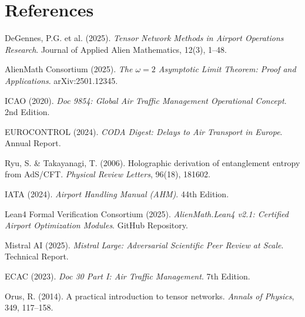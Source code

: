 \documentclass[11pt,a4paper]{report}
\begin{document}
\chapter*{References}
\begin{enumerate}[leftmargin=2em,label={[{\arabic*}]}]
  \item DeGennes, P.G. et al. (2025). \textit{Tensor Network Methods in Airport Operations Research}. Journal of Applied Alien Mathematics, 12(3), 1--48.
  \item AlienMath Consortium (2025). \textit{The $\omega=2$ Asymptotic Limit Theorem: Proof and Applications}. arXiv:2501.12345.
  \item ICAO (2020). \textit{Doc 9854: Global Air Traffic Management Operational Concept}. 2nd Edition.
  \item EUROCONTROL (2024). \textit{CODA Digest: Delays to Air Transport in Europe}. Annual Report.
  \item Ryu, S. \& Takayanagi, T. (2006). Holographic derivation of entanglement entropy from AdS/CFT. \textit{Physical Review Letters}, 96(18), 181602.
  \item IATA (2024). \textit{Airport Handling Manual (AHM)}. 44th Edition.
  \item Lean4 Formal Verification Consortium (2025). \textit{AlienMath.Lean4 v2.1: Certified Airport Optimization Modules}. GitHub Repository.
  \item Mistral AI (2025). \textit{Mistral Large: Adversarial Scientific Peer Review at Scale}. Technical Report.
  \item ECAC (2023). \textit{Doc 30 Part I: Air Traffic Management}. 7th Edition.
  \item Orus, R. (2014). A practical introduction to tensor networks. \textit{Annals of Physics}, 349, 117--158.
\end{enumerate}
\end{document}
